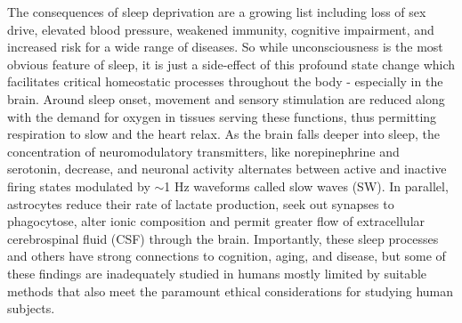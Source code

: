 

The consequences of sleep deprivation are a growing list including loss of sex drive, elevated blood pressure, weakened immunity, cognitive impairment, and increased risk for a wide range of diseases. So while unconsciousness is the most obvious feature of sleep, it is just a side-effect of this profound state change which facilitates critical homeostatic processes throughout the body - especially in the brain. Around sleep onset, movement and sensory stimulation are reduced along with the demand for oxygen in tissues serving these functions, thus permitting respiration to slow and the heart relax. As the brain falls deeper into sleep, the concentration of neuromodulatory transmitters, like norepinephrine and serotonin, decrease, and neuronal activity alternates between active and inactive firing states modulated by $\sim$1 Hz waveforms called slow waves (SW). In parallel, astrocytes reduce their rate of lactate production, seek out synapses to phagocytose, alter ionic composition and permit greater flow of extracellular cerebrospinal fluid (CSF) through the brain. Importantly, these sleep processes and others have strong connections to cognition, aging, and disease, but some of these findings are inadequately studied in humans mostly limited by suitable methods that also meet the paramount ethical considerations for studying human subjects.

